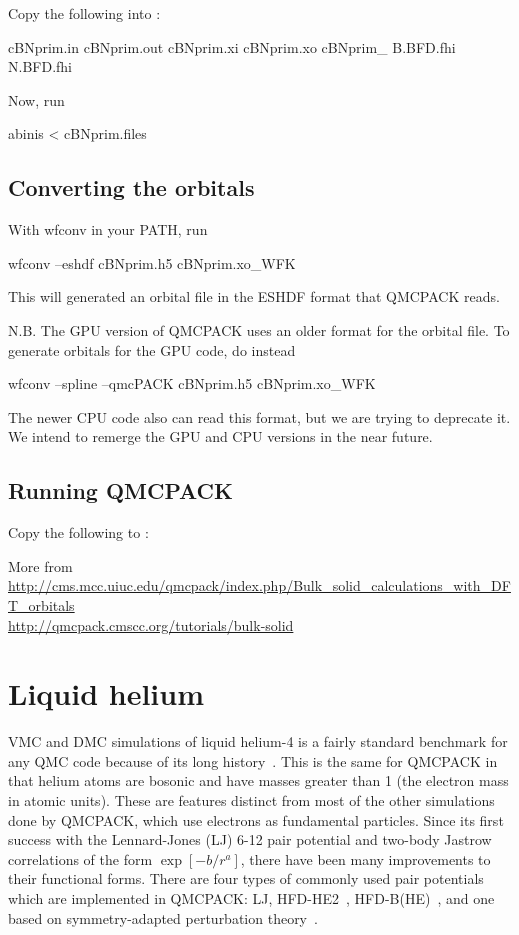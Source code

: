 Copy the following into :
\begin{code}
cBNprim.in
cBNprim.out
cBNprim.xi
cBNprim.xo
cBNprim_
B.BFD.fhi
N.BFD.fhi
\end{code}

Now, run
\begin{term}
abinis < cBNprim.files
\end{term}

\subsection*{Converting the orbitals}
With wfconv in your PATH, run
\begin{term}
wfconv --eshdf cBNprim.h5 cBNprim.xo_WFK
\end{term}

This will generated an orbital file in the ESHDF format that QMCPACK reads.

N.B. The GPU version of QMCPACK uses an older format for the orbital file. To generate orbitals for the GPU code, do instead
\begin{term}
wfconv --spline --qmcPACK cBNprim.h5 cBNprim.xo_WFK
\end{term}

The newer CPU code also can read this format, but we are trying to deprecate it. We intend to remerge the GPU and CPU versions in the near future. 

\subsection*{Running QMCPACK}
Copy the following to :

More from\\
\url{http://cms.mcc.uiuc.edu/qmcpack/index.php/Bulk_solid_calculations_with_DFT_orbitals}\\
\url{http://qmcpack.cmscc.org/tutorials/bulk-solid}
\section{Liquid helium}
VMC and DMC simulations of liquid helium-4 is a fairly standard benchmark for any QMC code because of its long history~\cite{PhysRev.138.A442,PhysRevA.9.2178}.  This is the same for QMCPACK in that helium atoms are bosonic and have masses greater than 1 (the electron mass in atomic units).  These are features distinct from most of the other simulations done by QMCPACK, which use electrons as fundamental particles.  Since its first success with the Lennard-Jones (LJ) 6-12 pair potential and two-body Jastrow correlations of the form $\exp[-b/r^a]$, there have been many improvements to their functional forms.  There are four types of commonly used pair potentials which are implemented in QMCPACK: LJ, HFD-HE2~\cite{Aziz1979}, HFD-B(HE)~\cite{Aziz1987}, and one based on symmetry-adapted perturbation theory~\cite{Jeziorska2007}.

